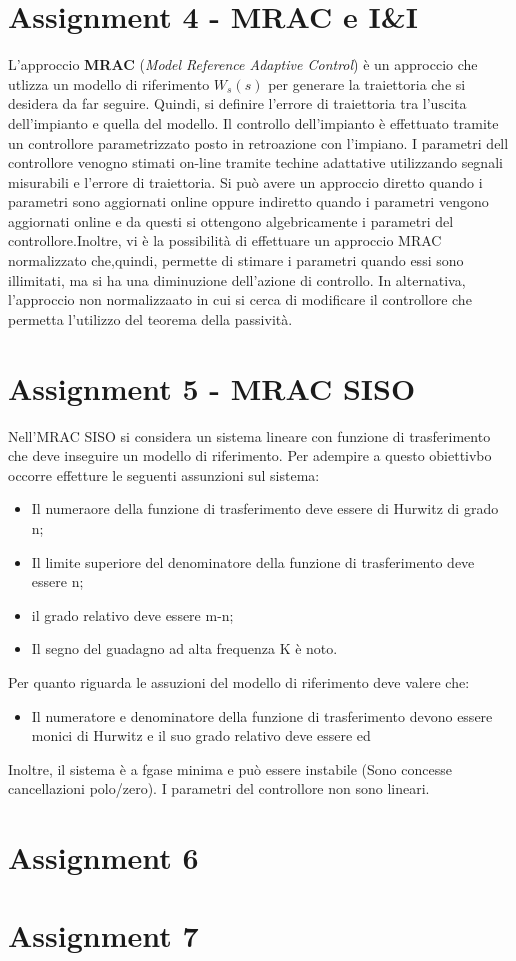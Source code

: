 \documentclass{article}
\begin{document}
\section{Assignment 4 - MRAC e I\&I}%
L'approccio \textbf{MRAC} (\emph{Model Reference Adaptive Control}) è un approccio che utlizza un modello di riferimento \(W_{s}(s)\) per generare la traiettoria che si desidera da far seguire. Quindi, si definire l'errore di traiettoria tra l'uscita dell'impianto e quella del modello. Il controllo dell'impianto è effettuato tramite un controllore parametrizzato posto in retroazione con l'impiano. I parametri dell controllore venogno stimati on-line tramite techine adattative utilizzando segnali misurabili e l'errore di traiettoria. Si può avere un approccio diretto quando i parametri sono aggiornati online oppure indiretto quando i parametri vengono aggiornati online e da questi si ottengono algebricamente i parametri del controllore.\newline Inoltre, vi è la possibilità di effettuare un approccio MRAC normalizzato che,quindi, permette di stimare i parametri quando essi sono illimitati, ma si ha una diminuzione dell'azione di controllo. In alternativa, l'approccio non normalizzaato in cui si cerca di modificare il controllore che permetta l'utilizzo del teorema della passività.
\section{Assignment 5 - MRAC SISO}%
Nell'MRAC SISO si considera un sistema lineare con funzione di trasferimento che deve inseguire un modello di riferimento. Per adempire a questo obiettivbo occorre effetture le seguenti assunzioni sul sistema:\begin{itemize}
    \item Il numeraore della funzione di trasferimento deve essere di Hurwitz di grado n;
    \item Il limite superiore del denominatore della funzione di trasferimento deve essere n;
    \item il grado relativo deve essere m-n;
    \item Il segno del guadagno ad alta frequenza K è noto.
\end{itemize}
Per quanto riguarda le assuzioni del modello di riferimento deve valere che:\begin{itemize}
    \item Il numeratore e denominatore della funzione di trasferimento devono essere monici di Hurwitz e il suo grado relativo deve essere ed
\end{itemize}
Inoltre, il sistema è a fgase minima e può essere instabile (Sono concesse cancellazioni polo/zero).\newline
I parametri del controllore non sono lineari.
\section{Assignment 6}

\section{Assignment 7}
\end{document}
